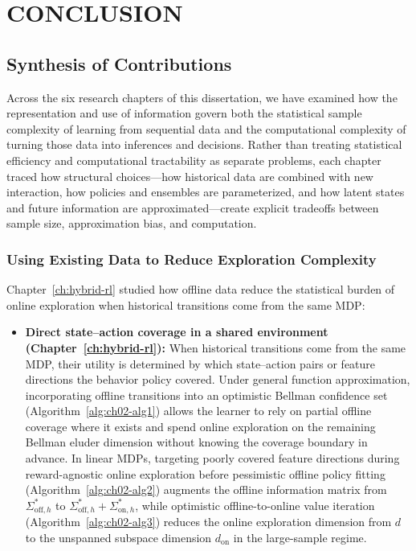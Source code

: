 \chapter{CONCLUSION}
\label{ch:conclusion}


\begin{aigenblock}

\section{Synthesis of Contributions}

Across the six research chapters of this dissertation, we have examined how the representation and use of information govern both the statistical sample complexity of learning from sequential data and the computational complexity of turning those data into inferences and decisions. Rather than treating statistical efficiency and computational tractability as separate problems, each chapter traced how structural choices---how historical data are combined with new interaction, how policies and ensembles are parameterized, and how latent states and future information are approximated---create explicit tradeoffs between sample size, approximation bias, and computation.

\subsection{Using Existing Data to Reduce Exploration Complexity}

Chapter~\ref{ch:hybrid-rl} studied how offline data reduce the statistical burden of online exploration when historical transitions come from the same MDP:
\begin{itemize}
\item \textbf{Direct state--action coverage in a shared environment (Chapter~\ref{ch:hybrid-rl}):} When historical transitions come from the same MDP, their utility is determined by which state--action pairs or feature directions the behavior policy covered. Under general function approximation, incorporating offline transitions into an optimistic Bellman confidence set (Algorithm~\ref{alg:ch02-alg1}) allows the learner to rely on partial offline coverage where it exists and spend online exploration on the remaining Bellman eluder dimension without knowing the coverage boundary in advance. In linear MDPs, targeting poorly covered feature directions during reward-agnostic online exploration before pessimistic offline policy fitting (Algorithm~\ref{alg:ch02-alg2}) augments the offline information matrix from $\Sigma_{\mathrm{off},h}^*$ to $\Sigma_{\mathrm{off},h}^* + \Sigma_{\mathrm{on},h}^*$, while optimistic offline-to-online value iteration (Algorithm~\ref{alg:ch02-alg3}) reduces the online exploration dimension from $d$ to the unspanned subspace dimension $d_{\mathrm{on}}$ in the large-sample regime.
\end{itemize}


\end{aigenblock}
